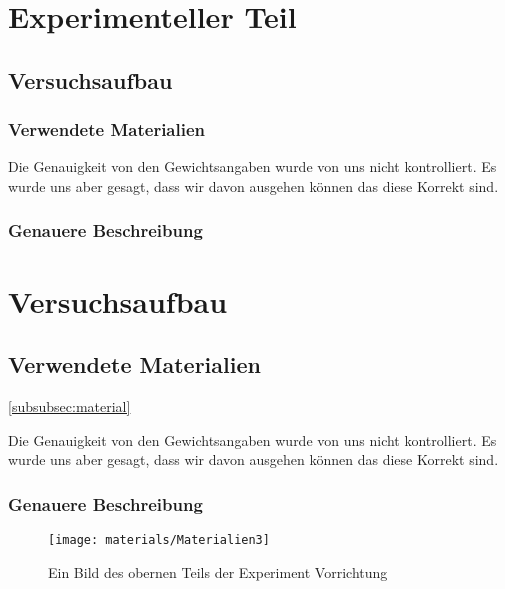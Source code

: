 \documentclass[../main.tex]{subfiles} %
\begin{document}
\section{Experimenteller Teil}\label{sec:experimenteller-teil}
    \subsection{Versuchsaufbau}\label{subsec:versuchsaufbau}
        \subsubsection{Verwendete Materialien}\label{subsubsec:zu-der-materialliste}
        \begin{tcolorbox}[title=Hinweis zu den Gewichtsangeben]
            Die Genauigkeit von den Gewichtsangaben wurde von uns nicht kontrolliert.
            Es wurde uns aber gesagt, dass wir davon ausgehen können das diese Korrekt sind.
        \end{tcolorbox}
        \subsubsection{Genauere Beschreibung}\label{subsubsec:materialien}

\section{Versuchsaufbau}\label{sec:versuchsaufbau}
    \subsection{Verwendete Materialien}\ref{subsubsec:material}\label{zu der Materialliste}
    \begin{tcolorbox}[title=Hinweis zu den Gewichtsangeben]
        Die Genauigkeit von den Gewichtsangaben wurde von uns nicht kontrolliert.
        Es wurde uns aber gesagt, dass wir davon ausgehen können das diese Korrekt sind.
    \end{tcolorbox}
    \subsubsection{Genauere Beschreibung}\label{subsubsec:materialien}

        \begin{figure}[H]
            \centering
            \texttt{[image: materials/Materialien3]}
            \caption{Ein Bild des obernen Teils der Experiment Vorrichtung  \textcolor{blue}{\underline{}}}
            \label{fig:material3}
        \end{figure}
\end{document}
